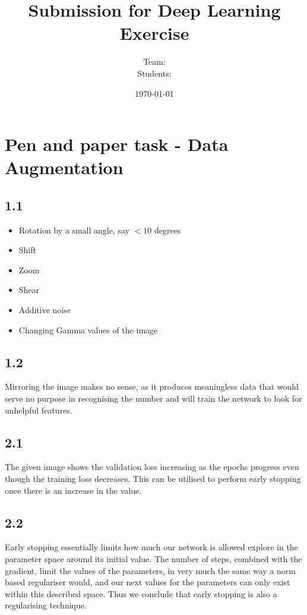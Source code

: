\documentclass[addpoints]{exam}
\title{Submission for Deep Learning Exercise \assignmentnumber}
\author{Team: \teamname\\Students: \students}
\date{\today}
\begin{document}
    \maketitle

\section{Pen and paper task - Data Augmentation}
\subsection{1.1}
\begin{itemize}
	\item Rotation by a small angle, say $<10$ degrees
	\item Shift
	\item Zoom
	\item Shear
	\item Additive noise
	\item Changing Gamma values of the image
\end{itemize}
\subsection{1.2}
Mirroring the image makes no sense, as it produces meaningless data that would serve no purpose in recognising the number and will train the network to look for unhelpful features.
\subsection{2.1}
The given image shows the validation loss increasing as the epochs progress even though the training loss decreases. This can be utilised to perform early stopping once there is an increase in the value.
\subsection{2.2}
Early stopping essentially limits how much our network is allowed explore in the parameter space around its initial value. The number of steps, combined with the gradient, limit the values of the parameters, in very much the same way a norm based regulariser would, and our next values for the parameters can only exist within this described space. Thus we conclude that early stopping is also a regularising technique.

    


\end{document}
